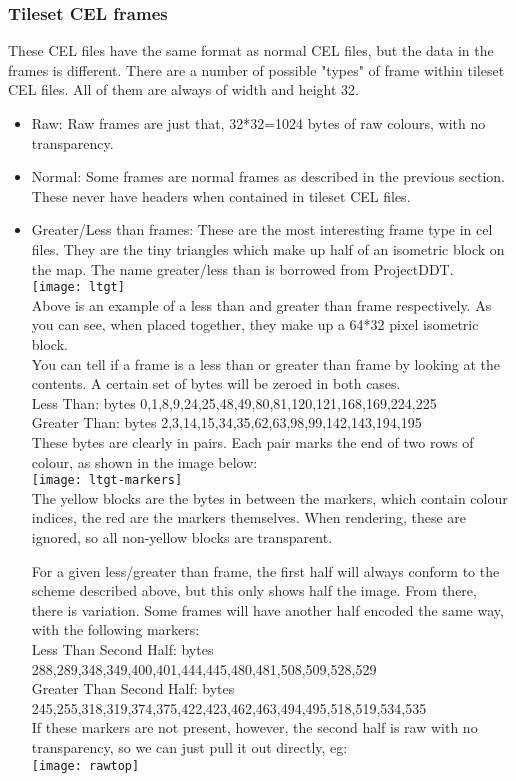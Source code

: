 \subsubsection{Tileset CEL frames}
	These CEL files have the same format as normal CEL files, but the data in the frames is different. There are a number of possible "types" of frame within tileset CEL files. All of them are always of width and height 32.
\begin{itemize}

	\item{Raw:} Raw frames are just that, 32*32=1024 bytes of raw colours, with no transparency. 
	
	\item{Normal:} Some frames are normal frames as described in the previous section. These never have headers when contained in tileset CEL files.
	
	\item{Greater/Less than frames:} These are the most interesting frame type in cel files. They are the tiny triangles which make up half of an isometric block on the map. The name greater/less than is borrowed from ProjectDDT\cite{ddt}. \\
\texttt{[image: ltgt]}\\ Above is an example of a less than and greater than frame respectively. As you can see, when placed together, they make up a 64*32 pixel isometric block.\\
You can tell if a frame is a less than or greater than frame by looking at the contents. A certain set of bytes will be zeroed in both cases.\\
Less Than: bytes 0,1,8,9,24,25,48,49,80,81,120,121,168,169,224,225\\
Greater Than: bytes 2,3,14,15,34,35,62,63,98,99,142,143,194,195\\

	These bytes are clearly in pairs. Each pair marks the end of two rows of colour, as shown in the image below:\\
\texttt{[image: ltgt-markers]}\\
The yellow blocks are the bytes in between the markers, which contain colour indices, the red are the markers themselves. When rendering, these are ignored, so all non-yellow blocks are transparent.

	For a given less/greater than frame, the first half will always conform to the scheme described above, but this only shows half the image.
	From there, there is variation. Some frames will have another half encoded the same way, with the following markers:\\
	Less Than Second Half: bytes 288,289,348,349,400,401,444,445,480,481,508,509,528,529\\
	Greater Than Second Half: bytes 245,255,318,319,374,375,422,423,462,463,494,495,518,519,534,535\\
	
	If these markers are not present, however, the second half is raw with no transparency, so we can just pull it out directly, eg:\\
	\texttt{[image: rawtop]}
\end{itemize}

